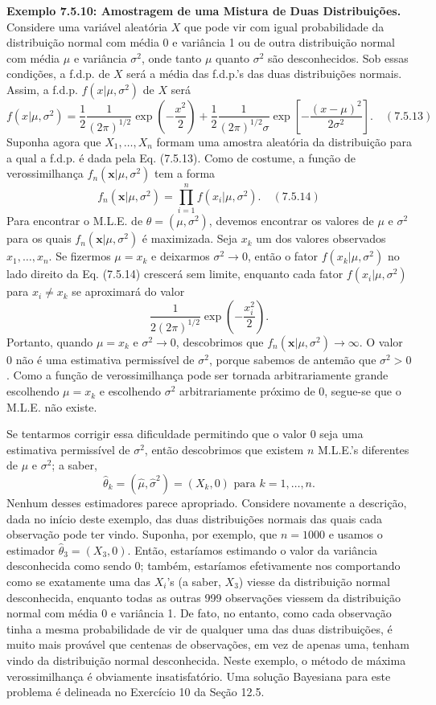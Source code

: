 \textbf{Exemplo 7.5.10: Amostragem de uma Mistura de Duas Distribuições.} Considere uma variável aleatória $X$ que pode vir com igual probabilidade da distribuição normal com média 0 e variância 1 ou de outra distribuição normal com média $\mu$ e variância $\sigma^2$, onde tanto $\mu$ quanto $\sigma^2$ são desconhecidos. Sob essas condições, a f.d.p. de $X$ será a média das f.d.p.'s das duas distribuições normais. Assim, a f.d.p. $f(x|\mu, \sigma^2)$ de $X$ será
$$ f(x|\mu, \sigma^2) = \frac{1}{2} \frac{1}{(2\pi)^{1/2}} \exp\left(-\frac{x^2}{2}\right) + \frac{1}{2} \frac{1}{(2\pi)^{1/2}\sigma} \exp\left[-\frac{(x-\mu)^2}{2\sigma^2}\right]. \quad (7.5.13) $$
Suponha agora que $X_1, \dots, X_n$ formam uma amostra aleatória da distribuição para a qual a f.d.p. é dada pela Eq. (7.5.13). Como de costume, a função de verossimilhança $f_n(\textbf{x}|\mu, \sigma^2)$ tem a forma
$$ f_n(\textbf{x}|\mu, \sigma^2) = \prod_{i=1}^{n} f(x_i|\mu, \sigma^2). \quad (7.5.14) $$
Para encontrar o M.L.E. de $\theta = (\mu, \sigma^2)$, devemos encontrar os valores de $\mu$ e $\sigma^2$ para os quais $f_n(\textbf{x}|\mu, \sigma^2)$ é maximizada. Seja $x_k$ um dos valores observados $x_1, \dots, x_n$. Se fizermos $\mu=x_k$ e deixarmos $\sigma^2 \to 0$, então o fator $f(x_k|\mu, \sigma^2)$ no lado direito da Eq. (7.5.14) crescerá sem limite, enquanto cada fator $f(x_i|\mu, \sigma^2)$ para $x_i \ne x_k$ se aproximará do valor
$$ \frac{1}{2(2\pi)^{1/2}} \exp\left(-\frac{x_i^2}{2}\right). $$
Portanto, quando $\mu=x_k$ e $\sigma^2 \to 0$, descobrimos que $f_n(\textbf{x}|\mu, \sigma^2) \to \infty$. O valor 0 não é uma estimativa permissível de $\sigma^2$, porque sabemos de antemão que $\sigma^2 > 0$. Como a função de verossimilhança pode ser tornada arbitrariamente grande escolhendo $\mu=x_k$ e escolhendo $\sigma^2$ arbitrariamente próximo de 0, segue-se que o M.L.E. não existe.

Se tentarmos corrigir essa dificuldade permitindo que o valor 0 seja uma estimativa permissível de $\sigma^2$, então descobrimos que existem $n$ M.L.E.'s diferentes de $\mu$ e $\sigma^2$; a saber,
$$ \hat{\theta}_k = (\hat{\mu}, \hat{\sigma}^2) = (X_k, 0) \text{ para } k=1, \dots, n. $$
Nenhum desses estimadores parece apropriado. Considere novamente a descrição, dada no início deste exemplo, das duas distribuições normais das quais cada observação pode ter vindo. Suponha, por exemplo, que $n=1000$ e usamos o estimador $\hat{\theta}_3 = (X_3, 0)$. Então, estaríamos estimando o valor da variância desconhecida como sendo 0; também, estaríamos efetivamente nos comportando como se exatamente uma das $X_i$'s (a saber, $X_3$) viesse da distribuição normal desconhecida, enquanto todas as outras 999 observações viessem da distribuição normal com média 0 e variância 1. De fato, no entanto, como cada observação tinha a mesma probabilidade de vir de qualquer uma das duas distribuições, é muito mais provável que centenas de observações, em vez de apenas uma, tenham vindo da distribuição normal desconhecida. Neste exemplo, o método de máxima verossimilhança é obviamente insatisfatório. Uma solução Bayesiana para este problema é delineada no Exercício 10 da Seção 12.5.

